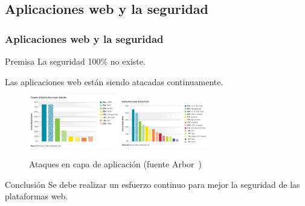 \subsection{Aplicaciones web y la seguridad}
\begin{frame}[shrink=20]
  \frametitle{Aplicaciones web y la seguridad}
  \begin{block}{Premisa}
     La seguridad 100\% no existe.
  \end{block}
  Las aplicaciones web están siendo atacadas continuamente.
  \begin{figure}
    \includegraphics[width=0.35\textwidth]{fig/application-attacks-2}%
    \includegraphics[width=0.35\textwidth]{fig/application-attacks-1}
    \label{fig:applicationattacks}
    \caption{\small{Ataques en capa de aplicación (fuente Arbor~\cite{articleArbor})}}
  \end{figure}
  \begin{alertblock}{Conclusión}
    Se debe realizar un esfuerzo continuo para mejor la seguridad de las plataformas web.
  \end{alertblock}
\end{frame}


